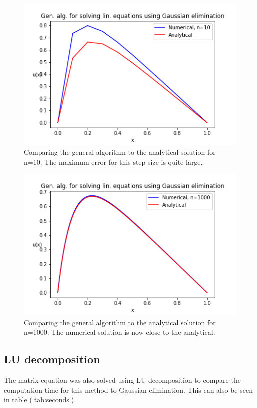 \documentclass[12pt]{article}
\begin{document}
\begin{figure}
\caption{Comparing the general algorithm to the analytical solution for n=10. The maximum error for this step size is quite large.}
\label{fig:10}
\includegraphics[]{1b_10.png}
\end{figure}

\begin{figure}
\caption{Comparing the general algorithm to the analytical solution for n=1000. The numerical solution is now close to the analytical.}
\label{fig:1000}
\includegraphics[]{1b_1000.png}
\end{figure}


\subsection{LU decomposition}
The matrix equation was also solved using LU decomposition to compare the computation time for this method to Gaussian elimination. This can also be seen in table (\ref{tab:seconds}).
\end{document}
